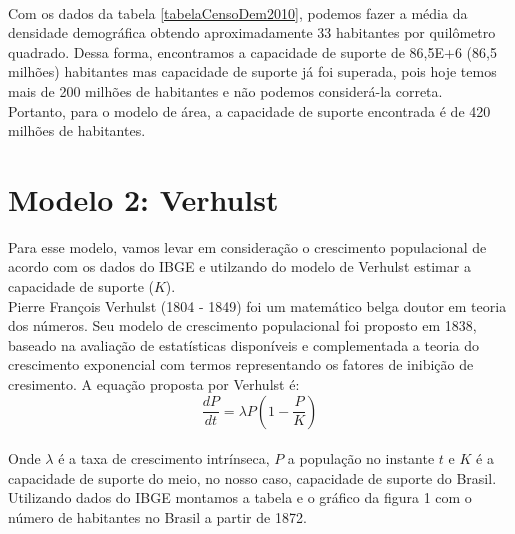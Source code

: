\documentclass[a4paper]{article}
\begin{document}
\\
Com os dados da tabela \ref{tabelaCensoDem2010}, podemos fazer a m\'{e}dia da densidade demogr\'{a}fica obtendo aproximadamente 33 habitantes por quil\^{o}metro quadrado. Dessa forma, encontramos a capacidade de suporte de 86,5E+6 (86,5 milh\~{o}es) habitantes mas capacidade de suporte j\'{a} foi superada, pois hoje temos mais de 200 milh\~{o}es de habitantes e n\~{a}o podemos consider\'{a}-la correta. 
\\
Portanto, para o modelo de \'{a}rea, a capacidade de suporte encontrada \'{e} de 420 milh\~{o}es de habitantes.
\\ 
\section{Modelo 2: Verhulst}
Para esse modelo, vamos levar em considera\c{c}\~{a}o o crescimento populacional de acordo com os dados do IBGE e utilzando do modelo de Verhulst estimar a capacidade de suporte ($K$).
\\
Pierre Fran\c{c}ois Verhulst (1804 - 1849) foi um  matem\'{a}tico belga doutor em teoria dos n\'{u}meros. Seu modelo de crescimento populacional foi proposto em 1838, baseado na avalia\c{c}\~{a}o de estat\'{i}sticas dispon\'{i}veis e complementada a teoria do crescimento exponencial com termos representando os fatores de inibi\c{c}\~{a}o de cresimento. A equa\c{c}\~{a}o proposta por Verhulst \'{e}:
\begin{equation}
\frac{dP}{dt}= \lambda P(1 - \frac{P}{K})
\end{equation}
\\
Onde $\lambda$ \'{e} a taxa de crescimento intr\'{i}nseca, $P$ a popula\c{c}\~{a}o no instante $t$ e $K$ \'{e} a capacidade de suporte do meio, no nosso caso, capacidade de suporte do Brasil.
\\
Utilizando dados do IBGE montamos a tabela e o gr\'{a}fico da figura 1 com o n\'{u}mero de habitantes no Brasil a partir de 1872. 
\end{document}
